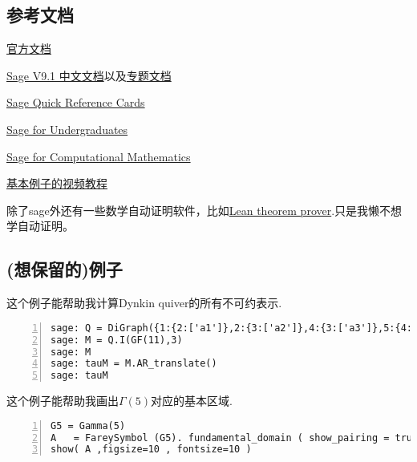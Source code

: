 \documentclass[11pt]{amsart}
\begin{document}
\subsection{参考文档}
\href{https://doc.sagemath.org/}{官方文档}

\href{https://www.osgeo.cn/sagemath/index.html}{Sage V9.1 中文文档}以及\href{https://www.osgeo.cn/sagemath/thematic_tutorials/}{专题文档}

\href{https://wiki.sagemath.org/quickref}{Sage Quick Reference Cards}

\href{http://gregorybard.com/Sage.html}{Sage for Undergraduates}

\href{http://dl.lateralis.org/public/sagebook/sagebook-ba6596d.pdf}{Sage for Computational
Mathematics}

\href{https://www.youtube.com/watch?v=A4j3qbCn1PM&list=PLYpVTXjEi1odEHr_-4fkbudq-gQnljSso&index=3}{基本例子的视频教程}

除了sage外还有一些数学自动证明软件，比如\href{https://leanprover-community.github.io/}{Lean theorem prover}.只是我懒不想学自动证明。
\subsection{(想保留的)例子}

这个例子能帮助我计算Dynkin quiver的所有不可约表示.
\begin{lstlisting}[numbers=left,numberstyle=\tiny,numbersep=10pt]
sage: Q = DiGraph({1:{2:['a1']},2:{3:['a2']},4:{3:['a3']},5:{4:['a4']},6:{3:['a5']}}).path_semigroup()
sage: M = Q.I(GF(11),3)
sage: M
sage: tauM = M.AR_translate()
sage: tauM
\end{lstlisting}

这个例子能帮助我画出$\Gamma(5)$对应的基本区域.
\begin{lstlisting}[numbers=left,numberstyle=\tiny,numbersep=10pt]
G5 = Gamma(5)
A   = FareySymbol (G5). fundamental_domain ( show_pairing = true )
show( A ,figsize=10 , fontsize=10 )
\end{lstlisting}
\end{document}
